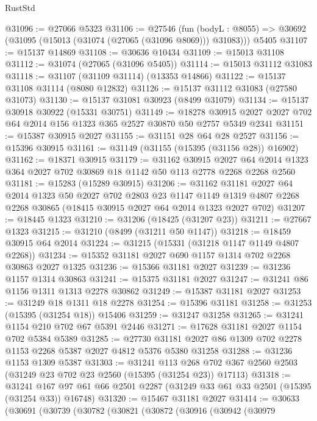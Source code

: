 \begin{lexlean}{RustStd}
\begin{coremodule}
@31096 := @27066 @5323
@31106 := @27546
    (fun (bodyL : @8055) => @30692 (@31095 (@15013 (@31074 (@27065 (@31096 @8069))) @31083)))
    @5405
@31107 := @15137 @14869
@31108 := @30636 @10434
@31109 := @15013 @31108
@31112 := @31074 (@27065 (@31096 @5405))
@31114 := @15013 @31112 @31083
@31118 := @31107 (@31109 @31114) (@13353 @14866)
@31122 := @15137 @31108 @31114 (@8080 @12832)
@31126 := @15137 @31112 @31083 (@27580 @31073)
@31130 := @15137 @31081 @30923 (@8499 @31079)
@31134 := @15137 @30918 @30922 (@15331 @30751)
@31149 := @18278
    @30915
    @2027
    @2027
    @702
    @64
    @2014
    @156
    @1323
    @365
    @2527
    @30870
    @50
    @2757
    @5349
    @2341
@31151 := @15387 @30915 @2027
@31155 := @31151 @28 @64 @28 @2527
@31156 := @15396 @30915
@31161 := @31149 (@31155 (@15395 (@31156 @28)) @16902)
@31162 := @18371 @30915
@31179 := @31162
    @30915
    @2027
    @64
    @2014
    @1323
    @364
    @2027
    @702
    @30869
    @18
    @1142
    @50
    @113
    @2778
    @2268
    @2268
    @2560
@31181 := @15283 (@15289 @30915)
@31206 := @31162
    @31181
    @2027
    @64
    @2014
    @1323
    @50
    @2027
    @702
    @2803
    @23
    @1147
    @1149
    @1319
    @4807
    @2268
    @2268
    @30865
    (@18415 @30915 @2027 @64 @2014 @1323 @2027 @702)
@31207 := @18445 @1323
@31210 := @31206 (@18425 (@31207 @23))
@31211 := @27667 @1323
@31215 := @31210 (@8499 (@31211 @50 @1147))
@31218 := @18459 @30915 @64 @2014
@31224 := @31215 (@15331 (@31218 @1147 @1149 @4807 @2268))
@31234 := @15352 @31181 @2027 @690 @1157 @1314 @702 @2268 @30863 @2027 @1325
@31236 := @15366 @31181 @2027
@31239 := @31236 @1157 @1314 @30863
@31241 := @15375 @31181 @2027
@31247 := @31241 @86 @1156 @1311 @1313 @2278 @30862
@31249 := @15387 @31181 @2027
@31253 := @31249 @18 @1311 @18 @2278
@31254 := @15396 @31181
@31258 := @31253 (@15395 (@31254 @18)) @15406
@31259 := @31247 @31258
@31265 := @31241 @1154 @210 @702 @67 @5391 @2446
@31271 := @17628 @31181 @2027 @1154 @702 @5384 @5389
@31285 := @27730 @31181 @2027 @86 @1309 @702 @2278 @1153 @2268 @5387 @2027 @4812 @5376 @5380 @31258
@31288 := @31236 @1153 @1309 @5387
@31303 := @31241
    @113
    @268
    @702
    @367
    @2560
    @2503
    (@31249 @23 @702 @23 @2560 (@15395 (@31254 @23)) @17113)
@31318 := @31241
    @167
    @97
    @61
    @66
    @2501
    @2287
    (@31249 @33 @61 @33 @2501 (@15395 (@31254 @33)) @16748)
@31320 := @15467 @31181 @2027
@31414 := @30633
    (@30691
      (@30739
        (@30782
          (@30821
            (@30872
              (@30916
                (@30942
                  (@30979

\end{coremodule}
\end{lexlean}
